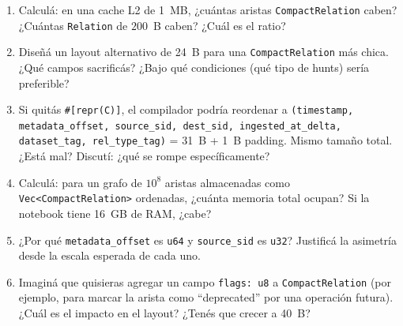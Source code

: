\begin{ejercicios}
\begin{enumerate}
    \item \starred{} Calculá: en una cache L2 de 1~MB, ¿cuántas
    aristas \texttt{CompactRelation} caben? ¿Cuántas
    \texttt{Relation} de \(200\)~B caben? ¿Cuál es el ratio?

    \item Diseñá un layout alternativo de 24~B para una
    \texttt{CompactRelation} más chica. ¿Qué campos sacrificás?
    ¿Bajo qué condiciones (qué tipo de hunts) sería preferible?

    \item \starred{} Si quitás \texttt{\#[repr(C)]}, el
    compilador podría reordenar a \texttt{(timestamp, metadata\_offset,
    source\_sid, dest\_sid, ingested\_at\_delta, dataset\_tag,
    rel\_type\_tag)} = 31~B + 1~B padding. Mismo tamaño total.
    ¿Está mal? Discutí: ¿qué se rompe específicamente?

    \item Calculá: para un grafo de \(10^8\) aristas almacenadas como
    \texttt{Vec<CompactRelation>} ordenadas, ¿cuánta memoria total
    ocupan? Si la notebook tiene 16~GB de RAM, ¿cabe?

    \item ¿Por qué \texttt{metadata\_offset} es \texttt{u64} y
    \texttt{source\_sid} es \texttt{u32}? Justificá la asimetría
    desde la escala esperada de cada uno.

    \item Imaginá que quisieras agregar un campo
    \texttt{flags: u8} a \texttt{CompactRelation} (por ejemplo,
    para marcar la arista como ``deprecated'' por una operación
    futura). ¿Cuál es el impacto en el layout? ¿Tenés que crecer
    a 40~B?
\end{enumerate}
\end{ejercicios}
